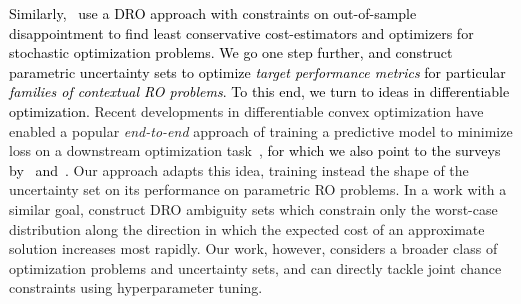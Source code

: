 \documentclass[11pt]{article}
\newcommand{\RC}[1]{\textcolor{black}{#1}}
\begin{document}
\RC{Similarly,~\cite{vanparys2021data} use a \gls{DRO} approach with constraints on out-of-sample disappointment to find least conservative cost-estimators and optimizers for stochastic optimization problems.}
\RC{We go
one step further, and construct parametric uncertainty sets to optimize {\it target performance metrics} for particular {\it families of contextual \gls{RO} problems}. To this end, we turn to ideas in differentiable optimization.}  
Recent developments in differentiable convex optimization have enabled a popular {\it end-to-end} approach of training a predictive model to minimize loss on a downstream optimization task~\citep{amos1, end1,end2,end3,end-to-end,predict_opt}, \RC{for which we also point to the surveys by~\cite{end-survey} and~\cite{dfl}.}
Our approach adapts this idea, training instead the shape of the uncertainty set on its performance on parametric \gls{RO} problems. 
In a work with a similar goal, \cite{schuurmans2023distributionally} construct \gls{DRO} ambiguity sets which constrain only the worst-case distribution along the direction in which the expected cost of an approximate solution increases most rapidly.
Our work, however, considers a broader class of optimization problems and uncertainty sets, and can directly tackle joint chance constraints using hyperparameter tuning.
\end{document}

